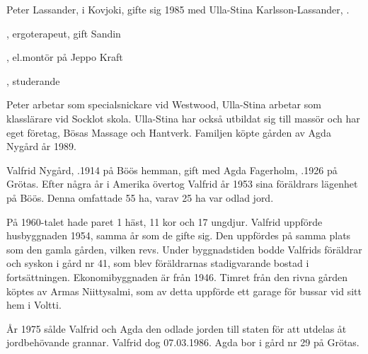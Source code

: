 


Peter Lassander,  i Kovjoki, gifte sig 1985 med Ulla-Stina Karlsson-Lassander, .
\begin{jhchildren}
  \item {}, ergoterapeut, gift Sandin
  \item {}, el.montör på Jeppo Kraft
  \item {}, studerande
\end{jhchildren}

Peter arbetar som specialsnickare vid Westwood, Ulla-Stina arbetar som klasslärare vid Socklot skola. Ulla-Stina har också utbildat sig till massör och har eget företag, Bösas Massage och Hantverk. Familjen köpte gården av Agda Nygård år 1989.


Valfrid Nygård, .1914 på Böös hemman, gift med Agda Fagerholm, .1926 på Grötas. Efter några år i Amerika övertog Valfrid år 1953 sina föräldrars lägenhet på Böös. Denna omfattade 55 ha, varav 25 ha var odlad jord.

På 1960-talet hade paret 1 häst, 11 kor och 17 ungdjur. Valfrid uppförde husbyggnaden 1954, samma år som de gifte sig. Den uppfördes på samma plats som den gamla gården, vilken revs. Under byggnadstiden bodde Valfrids föräldrar och syskon i gård nr 41, som blev föräldrarnas stadigvarande bostad i fortsättningen. Ekonomibyggnaden är från 1946. Timret från den rivna gården köptes av Armas Niittysalmi, som av detta uppförde ett garage för bussar vid sitt hem i Voltti.

År 1975 sålde Valfrid och Agda den odlade jorden till staten för att utdelas åt jordbehövande grannar. Valfrid dog 07.03.1986. Agda bor i gård nr 29 på Grötas.






